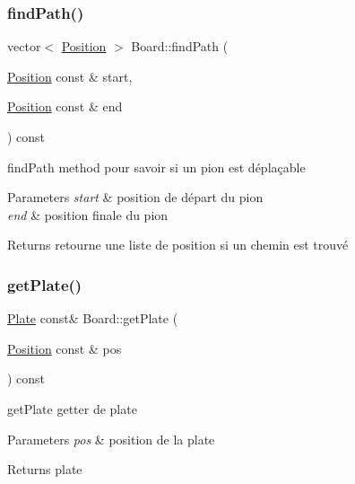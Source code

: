 \subsubsection{\texorpdfstring{findPath()}{findPath()}}
{\footnotesize\ttfamily vector$<$ \mbox{\hyperlink{class_position}{Position}} $>$ Board\+::find\+Path (\begin{DoxyParamCaption}\item[{\mbox{\hyperlink{class_position}{Position}} const \&}]{start,  }\item[{\mbox{\hyperlink{class_position}{Position}} const \&}]{end }\end{DoxyParamCaption}) const}



find\+Path method pour savoir si un pion est déplaçable 


\begin{DoxyParams}{Parameters}
{\em start} & position de départ du pion \\
\hline
{\em end} & position finale du pion \\
\hline
\end{DoxyParams}
\begin{DoxyReturn}{Returns}
retourne une liste de position si un chemin est trouvé 
\end{DoxyReturn}
\mbox{\label{class_board_ada3e38ef2a96cb211f6ea1832ae50667}} 
\subsubsection{\texorpdfstring{getPlate()}{getPlate()}}
{\footnotesize\ttfamily \mbox{\hyperlink{class_plate}{Plate}} const\& Board\+::get\+Plate (\begin{DoxyParamCaption}\item[{\mbox{\hyperlink{class_position}{Position}} const \&}]{pos }\end{DoxyParamCaption}) const\hspace{0.3cm}{\ttfamily [inline]}}



get\+Plate getter de plate 


\begin{DoxyParams}{Parameters}
{\em pos} & position de la plate \\
\hline
\end{DoxyParams}
\begin{DoxyReturn}{Returns}
plate 
\end{DoxyReturn}
\mbox{\label{class_board_ae0aca00591bd61f362c48b00a3caf80e}} 
